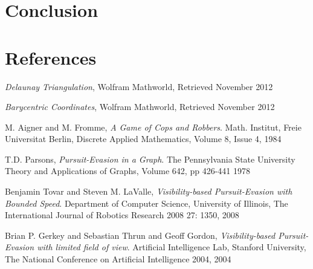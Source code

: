 \documentclass{article}
\begin{document}
\section{Conclusion}

\section{References}

\begin{thebibliography}{9}

  \emph{Delaunay Triangulation},
  Wolfram Mathworld,
  Retrieved November 2012
  
  \emph{Barycentric Coordinates},
  Wolfram Mathworld,
  Retrieved November 2012

  M. Aigner and M. Fromme,
  \emph{A Game of Cops and Robbers}.
  Math. Institut, Freie Universitat Berlin,
  Discrete Applied Mathematics, Volume 8, Issue 4,
  1984
  
  T.D. Parsons,
  \emph{Pursuit-Evasion in a Graph}.
  The Pennsylvania State University
  Theory and Applications of Graphs, Volume 642, pp 426-441
  1978
  
  Benjamin Tovar and Steven M. LaValle,
  \emph{Visibility-based Pursuit-Evasion with Bounded Speed}.
  Department of Computer Science, University of Illinois,
  The International Journal of Robotics Research 2008 27: 1350,
  2008
  
  Brian P. Gerkey and Sebastian Thrun and Geoff Gordon,
  \emph{Visibility-based Pursuit-Evasion with limited field of view}.
  Artificial Intelligence Lab, Stanford University,
  The National Conference on Artificial Intelligence 2004,
  2004

\end{thebibliography}
\end{document}
